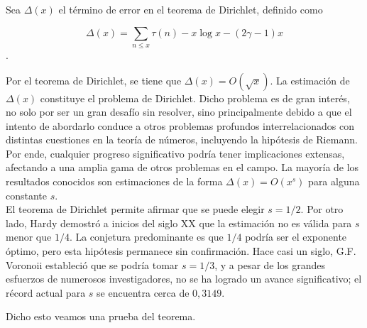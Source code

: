 Sea $\Delta(x)$ el término de error en el teorema de Dirichlet, definido como 

$$\Delta(x)=\sum_{n \leqslant x} \tau(n)-x \log x-(2 \gamma-1) x$$.


 Por el teorema de Dirichlet, se tiene que $\Delta(x)=O(\sqrt{x})$. La estimación de $\Delta(x)$ constituye el problema de Dirichlet. Dicho problema es de gran interés, no solo por ser un gran desafío sin resolver, sino principalmente debido a que el intento de abordarlo conduce a otros problemas profundos interrelacionados con distintas cuestiones en la teoría de números, incluyendo la hipótesis de Riemann. Por ende, cualquier progreso significativo podría tener implicaciones extensas, afectando a una amplia gama de otros problemas en el campo. La mayoría de los resultados conocidos son estimaciones de la forma $\Delta(x)=O\left(x^s\right)$ para alguna constante $s$.\\


El teorema de Dirichlet permite afirmar que se puede elegir $s=1/2$. Por otro lado, Hardy demostró a inicios del siglo XX que la estimación no es válida para $s$ menor que $1/4$. La conjetura predominante es que $1/4$ podría ser el exponente óptimo, pero esta hipótesis permanece sin confirmación. Hace casi un siglo, G.F. Voronoii estableció que se podría tomar $s=1/3$, y a pesar de los grandes esfuerzos de numerosos investigadores, no se ha logrado un avance significativo; el récord actual para $s$ se encuentra cerca de $0,3149$.

Dicho esto veamos una prueba del teorema.\\

